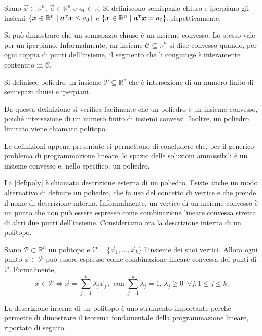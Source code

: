 \begin{definition}
    Siano $\vec{x} \in \mathbb{R}^n,\ \vec{a} \in \mathbb{R}^n$ e $a_{0}
    \in \mathbb{R}$. Si definiscono semispazio chiuso e iperpiano gli
    insiemi
    \(
        \{ \bm{x} \in \mathbb{R}^n \mid \bm{a}^{\scriptscriptstyle\mathrm{T}}\bm{x} \le a_{0}\}
    \)
    e
    \(
        \{ \bm{x} \in \mathbb{R}^n \mid \bm{a}^{\scriptscriptstyle\mathrm{T}}\bm{x} = a_{0}\},
    \)
    rispettivamente.
\end{definition}
Si può dimostrare che un semispazio chiuso è un insieme convesso. Lo stesso
vale per un iperpiano.  Informalmente, un insieme $\mathcal{C} \subseteq
\mathbb{R}^n$ si dice convesso quando, per ogni coppia di punti
dell'insieme, il segmento che li congiunge è interamente contenuto in
$\mathcal{C}$.
\begin{definition}\label{def:poly}
    Si definisce poliedro un insieme $\mathcal{P} \subseteq \mathbb{R}^n$
    che è intersezione di un numero finito di semispazi chiusi e iperpiani.
\end{definition}
Da questa definizione si verifica facilmente che un poliedro è un insieme
convesso, poiché intersezione di un numero finito di insiemi convessi.
Inoltre, un poliedro limitato viene chiamato politopo.

Le definizioni appena presentate ci permettono di concludere che, per il
generico problema di programmazione lineare, lo spazio delle soluzioni
ammissibili è un insieme convesso e, nello specifico, un poliedro.

La \cref{def:poly} è chiamata descrizione esterna di un poliedro. Esiste
anche un modo alternativo di definire un poliedro, che fa uso del concetto
di vertice e che prende il nome di descrizione interna. Informalmente, un
vertice di un insieme convesso è un punto che non può essere espresso come
combinazione lineare convessa stretta di altri due punti dell'insieme.
Consideriamo ora la descrizione interna di un politopo.


\begin{theorem}
    Siano $\mathcal{P} \subset \mathbb{R}^n$ un politopo e
    $\mathcal{V} = \{ \vec{x}_1, \ldots, \vec{x}_k\}$ l'insieme dei suoi
    vertici. Allora ogni punto $\vec{x} \in \mathcal{P}$ può essere
    espresso come combinazione lineare convessa dei punti di $\mathcal{V}$.
    Formalmente,
    \[
        \vec{x} \in \mathcal{P} \iff
            \vec{x} = \sum_{j=1}^{k} \lambda_j \vec{x}_j\,, \text{ con }
            \sum_{j=1}^{k} \lambda_j = 1,\,
            \lambda_j \ge 0 \,\,\, \forall j\colon 1 \le j \le k.
    \]
\end{theorem}
La descrizione interna di un politopo è uno strumento importante perché
permette di dimostrare il teorema fondamentale della programmazione
lineare, riportato di seguito.

